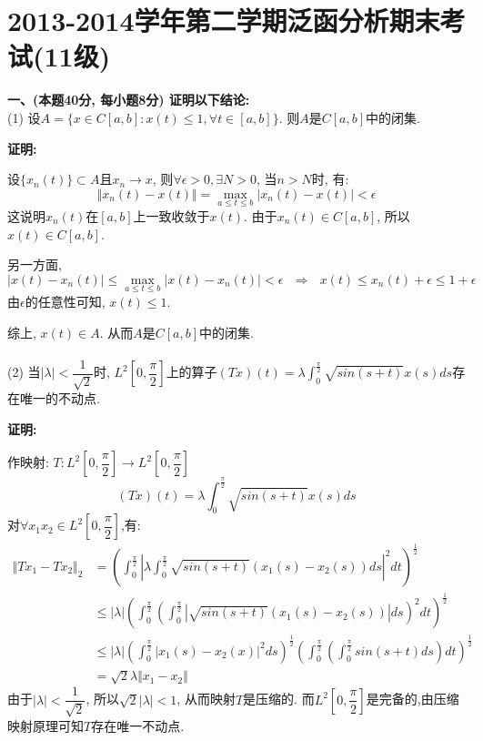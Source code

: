 \documentclass{article}
\begin{document}
\newpage

\section{2013-2014学年第二学期泛函分析期末考试(11级)}
\textbf{一、(本题40分, 每小题8分) 证明以下结论:}  \\

(1) 设$A = \{ x \in C[a,b]: x(t) \leq 1, \forall t \in [a,b] \}$. 则$A$是$C[a,b]$中的闭集. 

\textbf{证明:}

设$\{ x_n(t) \} \subset A$且$x_n \rightarrow x$, 则$\forall \epsilon >0, \exists N>0$, 当$n > N$时, 有:
$$ \Vert x_n(t) - x(t) \Vert = \max\limits_{a \leq t \leq b} |x_n(t) - x(t)| < \epsilon $$
这说明$x_n(t)$在$[a,b]$上一致收敛于$x(t)$. 由于$x_n(t) \in C[a,b]$, 所以$x(t) \in C[a, b]$.

另一方面, 
$$ |x(t) - x_n(t)| \leq \max\limits_{a \leq t \leq b} |x(t) - x_n(t)| < \epsilon \ \ \ \Rightarrow \ \ \  x(t) \leq x_n(t) + \epsilon \leq 1 + \epsilon $$
由$\epsilon$的任意性可知, $x(t) \leq 1$. 

综上, $x(t) \in A$. 从而$A$是$C[a,b]$中的闭集. \\  \\

(2) 当$|\lambda|<\dfrac{1}{\sqrt{2}}$时, $L^2[0,\dfrac{\pi}{2}]$上的算子$(Tx)(t) = \lambda \int_0^{\frac{\pi}{2}} \sqrt{sin(s+t)}x(s)ds$存在唯一的不动点. 

\textbf{证明:}

作映射: $T : L^2[0,\dfrac{\pi}{2}] \rightarrow L^2[0,\dfrac{\pi}{2}]$
$$ (Tx)(t) = \lambda \int_0^{\frac{\pi}{2}} \sqrt{sin(s+t)}x(s)ds $$
对$\forall x_1 x_2 \in L^2[0,\dfrac{\pi}{2}]$,有:
\begin{align*}
\Vert Tx_1 - Tx_2 \Vert_2 &= \left(\int_0^{\frac{\pi}{2}}\left|\lambda\int_0^{\frac{\pi}{2}} \sqrt{sin(s+t)}(x_1(s)-x_2(s))ds\right|^2dt \right)^{\frac{1}{2}} \\
    &\leq |\lambda| \left( \int_0^{\frac{\pi}{2}}\left(\int_0^{\frac{\pi}{2}} |\sqrt{sin(s+t)}(x_1(s)-x_2(s))|ds\right)^2 dt \right)^{\frac{1}{2}} \\
    &\leq |\lambda| \left(\int_0^{\frac{\pi}{2}} |x_1(s) - x_2(x)|^2ds \right)^{\frac{1}{2}} \left(\int_0^{\frac{\pi}{2}} \left(\int_0^{\frac{\pi}{2}} sin(s+t)ds \right) dt \right)^{\frac{1}{2}} \\
   & = \sqrt{2}\lambda \Vert x_1 - x_2 \Vert 
\end{align*}
由于$|\lambda | < \dfrac{1}{\sqrt{2}}$, 所以$\sqrt{2}|\lambda| <1$, 从而映射$T$是压缩的. 而$ L^2[0,\dfrac{\pi}{2}]$是完备的,由压缩映射原理可知$T$存在唯一不动点. \\  \\ 
\end{document}
